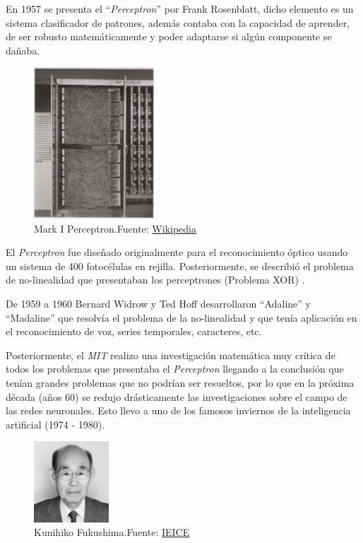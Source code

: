 En 1957 se presenta el ``\textit{Perceptron}'' por {Frank Rosenblatt}, dicho elemento es un sistema clasificador de patrones, además contaba con la capacidad de aprender, de ser robusto matemáticamente y poder adaptarse si algún componente se dañaba.

\begin{figure}[H]
    \centering
    \includegraphics[width=0.4\textwidth]{figures/perceptron.png}
    \caption{Mark I Perceptron.\newline{}Fuente: \href{https://en.wikipedia.org/wiki/Perceptron}{Wikipedia}}
    \label{fig:perceptron}
\end{figure}

El \textit{Perceptron} fue diseñado originalmente para el reconocimiento óptico usando un sistema de 400 fotocélulas en rejilla.
Posteriormente, se describió el problema de no-linealidad que presentaban los perceptrones (Problema XOR) \cite{cuevastello2018apuntes}.

De 1959 a 1960 {Bernard Widrow} y {Ted Hoff} desarrollaron ``Adaline'' y ``Madaline'' \cite{widrow1960adaptive} que resolvía el problema de la no-linealidad y que tenía aplicación en el reconocimiento de voz, series temporales, caracteres, etc.

Posteriormente, el \textit{MIT} realizo una investigación matemática muy crítica de todos los problemas que presentaba el \textit{Perceptron} llegando a la conclusión que tenían grandes problemas que no podrían ser resueltos, por lo que en la próxima década (años 60) se redujo drásticamente las investigaciones sobre el campo de las redes neuronales.
Esto llevo a uno de los famosos inviernos de la inteligencia artificial (1974 - 1980).

\begin{figure}[H]
    \centering
    \includegraphics[width=0.25\textwidth]{figures/Kunihiko Fukushima.jpg}
    \caption{Kunihiko Fukushima.\newline{}Fuente: \href{https://www.ieice.org/eng/about_ieice/new_honorary_members_award_winners/2017/meiyo_05e.html}{IEICE}}
    \label{fig:kunihiko-fukushima}
\end{figure}


